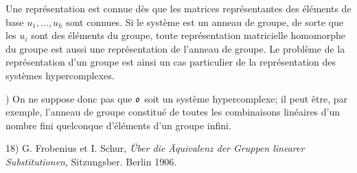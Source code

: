 Une représentation est connue dès que les matrices représentantes des éléments de base $u_1,\ldots,u_h$ sont connues. Si le système est un anneau de groupe, de sorte que les $u_i$ sont des éléments du groupe, toute représentation matricielle homomorphe du groupe est aussi une représentation de l'anneau de groupe. Le problème de la représentation d'un groupe est ainsi un cas particulier de la représentation des systèmes hypercomplexes.

{\footnotesize{}) On ne suppose donc pas que $\mathfrak{o}$ soit un système hypercomplexe; il peut être, par exemple, l'anneau de groupe constitué de toutes les combinaisons linéaires d'un nombre fini quelconque d'éléments d'un groupe infini.\par
18) G. Frobenius et I. Schur, \emph{Über die Äquivalenz der Gruppen linearer Substitutionen}, Sitzungsber. Berlin 1906.\par}
